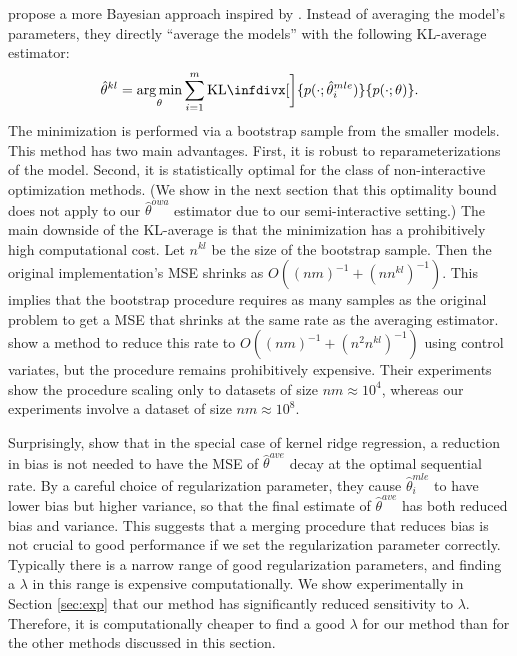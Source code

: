 \documentclass[twoside]{article}
\DeclareMathOperator*{\argmin}{arg\,min}
\newcommand{\w}{\theta}
\newcommand{\wkl}{\hat\w^{kl}}
\newcommand{\wowa}{\hat\w^{owa}}
\newcommand{\wave}{\hat\w^{ave}}
\newcommand{\wmle}{\hat\w^{mle}}
\newcommand{\kl}{\text{KL}\infdivx}
\begin{document}
\cite{liu2014distributed} propose a more Bayesian approach inspired by \cite{merugu2003privacy}.
Instead of averaging the model's parameters,
they directly ``average the models'' with the following KL-average estimator:
\begin{equation}
\wkl = \argmin_\w \sum_{i=1}^m \kl[\bigg]{p(\cdot;\wmle_i)}{p(\cdot;\w)}
.
\end{equation}
The minimization is performed via a bootstrap sample from the smaller models.
This method has two main advantages.
First, it is robust to reparameterizations of the model.
Second, it is statistically optimal for the class of non-interactive optimization methods.
(We show in the next section that this optimality bound does not apply to our $\wowa$ estimator due to our semi-interactive setting.)
The main downside of the KL-average is that the minimization has a prohibitively high computational cost.
Let $n^{kl}$ be the size of the bootstrap sample.
Then the original implementation's MSE shrinks as $O((nm)^{-1}+(nn^{kl})^{-1})$.
This implies that the bootstrap procedure requires as many samples as the original problem to get a MSE that shrinks at the same rate as the averaging estimator.
\cite{han2016bootstrap} show a method to reduce this rate to $O((nm)^{-1}+(n^2n^{kl})^{-1})$ using control variates, but the procedure remains prohibitively expensive.
Their experiments show the procedure scaling only to datasets of size $nm\approx10^4$,
whereas our experiments involve a dataset of size $nm\approx10^8$.

Surprisingly, \cite{zhang2013divide} show that in the special case of kernel ridge regression,
a reduction in bias is not needed to have the MSE of $\wave$ decay at the optimal sequential rate.
By a careful choice of regularization parameter,
they cause $\wmle_i$ to have lower bias but higher variance,
so that the final estimate of $\wave$ has both reduced bias and variance.
This suggests that a merging procedure that reduces bias is not crucial to good performance if we set the regularization parameter correctly.
Typically there is a narrow range of good regularization parameters,
and finding a $\lambda$ in this range is expensive computationally.
We show experimentally in Section \ref{sec:exp} that our method has significantly reduced sensitivity to $\lambda$.
Therefore, it is computationally cheaper to find a good $\lambda$ for our method than for the other methods discussed in this section.
\end{document}
